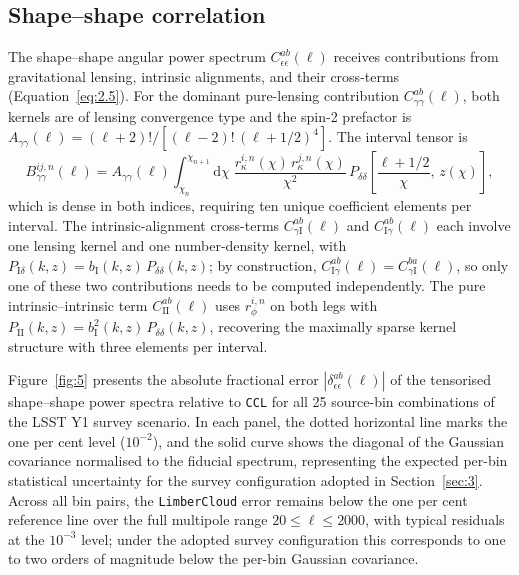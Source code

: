 \subsection{Shape--shape correlation} \label{sec:5.1}

The shape--shape angular power spectrum \(C_{\epsilon\epsilon}^{ab}(\ell)\) receives contributions from gravitational lensing, intrinsic alignments, and their cross-terms (Equation~\ref{eq:2.5}). For the dominant pure-lensing contribution \(C_{\gamma\gamma}^{ab}(\ell)\), both kernels are of lensing convergence type and the spin-2 prefactor is \(A_{\gamma\gamma}(\ell) = (\ell+2)!/[(\ell-2)!\,(\ell+1/2)^4]\). The interval tensor is
\begin{equation} \label{eq:5.7}
    B_{\gamma\gamma}^{ij,n}(\ell) = A_{\gamma\gamma}(\ell) \int_{\chi_n}^{\chi_{n+1}} \mathrm{d}\chi\; \frac{r_\kappa^{i,n}(\chi)\,r_\kappa^{j,n}(\chi)}{\chi^2}\, P_{\delta\delta}\!\left[\frac{\ell+1/2}{\chi},\, z(\chi)\right],
\end{equation}
which is dense in both indices, requiring ten unique coefficient elements per interval. The intrinsic-alignment cross-terms \(C_{\gamma\mathrm{I}}^{ab}(\ell)\) and \(C_{\mathrm{I}\gamma}^{ab}(\ell)\) each involve one lensing kernel and one number-density kernel, with \(P_{\mathrm{I}\delta}(k,z) = b_\mathrm{I}(k,z)\,P_{\delta\delta}(k,z)\); by construction, \(C_{\mathrm{I}\gamma}^{ab}(\ell) = C_{\gamma\mathrm{I}}^{ba}(\ell)\), so only one of these two contributions needs to be computed independently. The pure intrinsic--intrinsic term \(C_\mathrm{II}^{ab}(\ell)\) uses \(r_\phi^{i,n}\) on both legs with \(P_\mathrm{II}(k,z) = b_\mathrm{I}^2(k,z)\,P_{\delta\delta}(k,z)\), recovering the maximally sparse kernel structure with three elements per interval.

Figure~\ref{fig:5} presents the absolute fractional error \(|\delta_{\epsilon\epsilon}^{ab}(\ell)|\) of the tensorised shape--shape power spectra relative to \texttt{CCL} for all 25 source-bin combinations of the LSST Y1 survey scenario. In each panel, the dotted horizontal line marks the one per cent level (\(10^{-2}\)), and the solid curve shows the diagonal of the Gaussian covariance normalised to the fiducial spectrum, representing the expected per-bin statistical uncertainty for the survey configuration adopted in Section~\ref{sec:3}. Across all bin pairs, the \texttt{LimberCloud} error remains below the one per cent reference line over the full multipole range \(20 \le \ell \le 2000\), with typical residuals at the \(10^{-3}\) level; under the adopted survey configuration this corresponds to one to two orders of magnitude below the per-bin Gaussian covariance.

